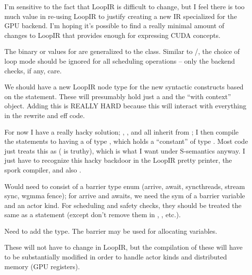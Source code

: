 \newpage
{}

I'm sensitive to the fact that LoopIR is difficult to change, but I feel there is too much value in re-using LoopIR to justify creating a new IR specialized for the GPU backend.
I'm hoping it's possible to find a really minimal amount of changes to LoopIR that provides enough for expressing CUDA concepts.

\filbreak
{}

 The binary  or  values for  are generalized to the  class.
Similar to /, the choice of loop mode should be ignored for all scheduling operations -- only the backend checks, if any, care.

\filbreak
{} We should have a new LoopIR node type for the new syntactic constructs based on the  statement.
These will presumably hold just a  and the ``with context'' object.
Adding this is REALLY HARD because this will interact with everything in the rewrite and eff code.

\filbreak
For now I have a really hacky solution; , , and  all inherit from ; I then compile the  statements to  having a  of type , which holds a ``constant'' of type .
Most code just treats this as  ( is truthy), which is what I want under S-semantics anyway.
I just have to recognize this hacky backdoor in the LoopIR pretty printer, the spork compiler, and also .

\filbreak
{} Would need to consist of a barrier type enum (arrive, await, syncthreads, stream sync, wgmma fence); for arrive and awaits, we need the sym of a barrier variable and an actor kind.
For scheduling and safety checks, they should be treated the same as a  statement (except don't remove them in , , etc.).

\filbreak
{} Need to add the  type.
The barrier may be used for allocating variables.

\filbreak
{} These will not have to change in LoopIR, but the compilation of these will have to be substantially modified in order to handle actor kinds and distributed memory (GPU registers).

